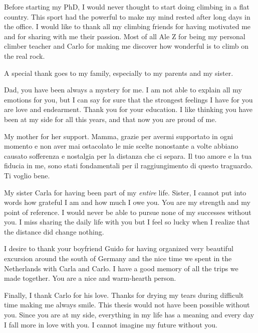 Before starting my PhD, I would never thought to start doing climbing in a flat country. This sport had the powerful to make my mind rested after long days in the office.
I would like to thank all my climbing friends for having motivated me and for sharing with me their passion. Most of all Ale Z for being my personal climber teacher and Carlo for making me discover how wonderful is to climb on the real rock. 

A special thank goes to my family, especially to my parents and my sister.

Dad, you have been always a mystery for me. I am not able to explain all my emotions for you, but I can say for sure that the strongest feelings I have for you are love and endearment. Thank you for your education. I like thinking you have been at my side for all this years, and that now you are proud of me.

My mother for her support. Mamma, grazie per avermi supportato in ogni momento e non aver mai ostacolato le mie scelte nonostante a volte abbiano causato sofferenza e nostalgia per la distanza che ci separa. Il tuo amore e la tua fiducia in me, sono stati fondamentali per il raggiungimento di questo traguardo. Ti voglio bene.   

My sister Carla for having been part of my \textit{entire} life. Sister, I cannot put into words how grateful I am and how much I owe you. You are my strength and my point of reference. I would never be able to pursue none of my successes without you.
I miss sharing the daily life with you but I feel so lucky when I realize that the distance did change nothing. 

I desire to thank your boyfriend Guido for having organized very beautiful excursion around the south of Germany and the nice time we spent in the Netherlands with Carla and Carlo. I have a good memory of all the trips we made together. You are a nice and warm-hearth person.

Finally, I thank Carlo for his love. 
Thanks for drying my tears during difficult time making me always smile. This thesis would not have been possible without you.
Since you are at my side, everything in my life has a meaning and every day I fall more in love with you. I cannot imagine my future without you.
